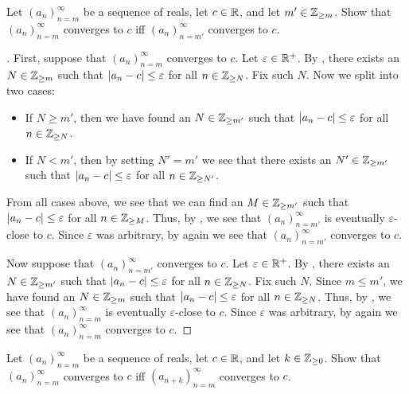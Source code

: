 \begin{ex}\label{i:ex:6.1.3}
  Let \((a_n)_{n = m}^\infty\) be a sequence of reals, let \(c \in \mathbb{R}\), and let \(m' \in \mathbb{Z}_{\geq m}\).
  Show that \((a_n)_{n = m}^\infty\) converges to \(c\) iff \((a_n)_{n = m'}^\infty\) converges to \(c\).
\end{ex}

\begin{proof}[]
  First, suppose that \((a_n)_{n = m}^\infty\) converges to \(c\).
  Let \(\varepsilon \in \mathbb{R}^+\).
  By , there exists an \(N \in \mathbb{Z}_{\geq m}\) such that \(\left\lvert a_n - c\right\rvert \leq \varepsilon\) for all \(n \in \mathbb{Z}_{\geq N}\).
  Fix such \(N\).
  Now we split into two cases:
  \begin{itemize}
    \item If \(N \geq m'\), then we have found an \(N \in \mathbb{Z}_{\geq m'}\) such that \(\left\lvert a_n - c\right\rvert \leq \varepsilon\) for all \(n \in \mathbb{Z}_{\geq N}\).
    \item If \(N < m'\), then by setting \(N' = m'\) we see that there exists an \(N' \in \mathbb{Z}_{\geq m'}\) such that \(\left\lvert a_n - c\right\rvert \leq \varepsilon\) for all \(n \in \mathbb{Z}_{\geq N'}\).
  \end{itemize}
  From all cases above, we see that we can find an \(M \in \mathbb{Z}_{\geq m'}\) such that \(\left\lvert a_n - c\right\rvert \leq \varepsilon\) for all \(n \in \mathbb{Z}_{\geq M}\).
  Thus, by , we see that \((a_n)_{n = m'}^\infty\) is eventually \(\varepsilon\)-close to \(c\).
  Since \(\varepsilon\) was arbitrary, by  again we see that \((a_n)_{n = m'}^\infty\) converges to \(c\).

  Now suppose that \((a_n)_{n = m'}^\infty\) converges to \(c\).
  Let \(\varepsilon \in \mathbb{R}^+\).
  By , there exists an \(N \in \mathbb{Z}_{\geq m'}\) such that \(\left\lvert a_n - c\right\rvert \leq \varepsilon\) for all \(n \in \mathbb{Z}_{\geq N}\).
  Fix such \(N\).
  Since \(m \leq m'\), we have found an \(N \in \mathbb{Z}_{\geq m}\) such that \(\left\lvert a_n - c\right\rvert \leq \varepsilon\) for all \(n \in \mathbb{Z}_{\geq N}\).
  Thus, by , we see that \((a_n)_{n = m}^\infty\) is eventually \(\varepsilon\)-close to \(c\).
  Since \(\varepsilon\) was arbitrary, by  again we see that \((a_n)_{n = m}^\infty\) converges to \(c\).
\end{proof}

\begin{ex}\label{i:ex:6.1.4}
  Let \((a_n)_{n = m}^\infty\) be a sequence of reals, let \(c \in \mathbb{R}\), and let \(k \in \mathbb{Z}_{\geq 0}\).
  Show that \((a_n)_{n = m}^\infty\) converges to \(c\) iff \((a_{n + k})_{n = m}^\infty\) converges to \(c\).
\end{ex}

